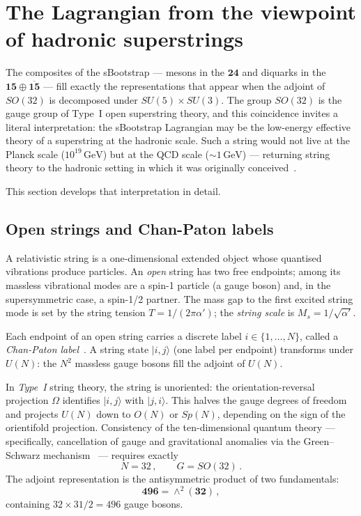 \documentclass[12pt,a4paper]{article}
\newcommand{\GeV}{\,\text{GeV}}
\begin{document}
\section{The Lagrangian from the viewpoint of hadronic superstrings}
\label{sec:strings}

The composites of the sBootstrap --- mesons in the $\mathbf{24}$ and
diquarks in the $\mathbf{15} \oplus \overline{\mathbf{15}}$ --- fill
exactly the representations that appear when the adjoint of $SO(32)$ is
decomposed under $SU(5) \times SU(3)$.  The group $SO(32)$ is the gauge
group of Type~I open superstring theory, and this coincidence invites a
literal interpretation: the sBootstrap Lagrangian may be the low-energy
effective theory of a superstring at the hadronic scale.  Such a string
would not live at the Planck scale ($10^{19}\GeV$) but at the QCD scale
($\sim 1\GeV$) --- returning string theory to the hadronic setting in
which it was originally conceived~\cite{Veneziano1968, Nambu1970}.

This section develops that interpretation in detail.

\subsection{Open strings and Chan-Paton labels}

A relativistic string is a one-dimensional extended object whose
quantised vibrations produce particles.  An \emph{open} string has two
free endpoints; among its massless vibrational modes are a spin-1
particle (a gauge boson) and, in the supersymmetric case, a spin-1/2
partner.  The mass gap to the first excited string mode is set by the
string tension $T = 1/(2\pi\alpha')$; the \emph{string scale} is
$M_s = 1/\sqrt{\alpha'}$.

Each endpoint of an open string carries a discrete label
$i \in \{1,\ldots,N\}$, called a \emph{Chan-Paton
label}~\cite{ChanPaton}.  A string state $|i, j\rangle$ (one label per
endpoint) transforms under $U(N)$: the $N^2$ massless gauge bosons fill
the adjoint of $U(N)$.

In \emph{Type~I} string theory, the string is unoriented: the
orientation-reversal projection $\Omega$ identifies $|i,j\rangle$ with
$|j,i\rangle$.  This halves the gauge degrees of freedom and projects
$U(N)$ down to $O(N)$ or $Sp(N)$, depending on the sign of the
orientifold projection.  Consistency of the ten-dimensional quantum
theory --- specifically, cancellation of gauge and gravitational
anomalies via the Green--Schwarz mechanism~\cite{GreenSchwarz} ---
requires exactly
\begin{equation}
N = 32\,,\qquad G = SO(32)\,.
\end{equation}
The adjoint representation is the antisymmetric product of two
fundamentals:
\begin{equation}
  \mathbf{496} = \wedge^2(\mathbf{32})\,,
\end{equation}
containing $32 \times 31/2 = 496$ gauge bosons.
\end{document}
